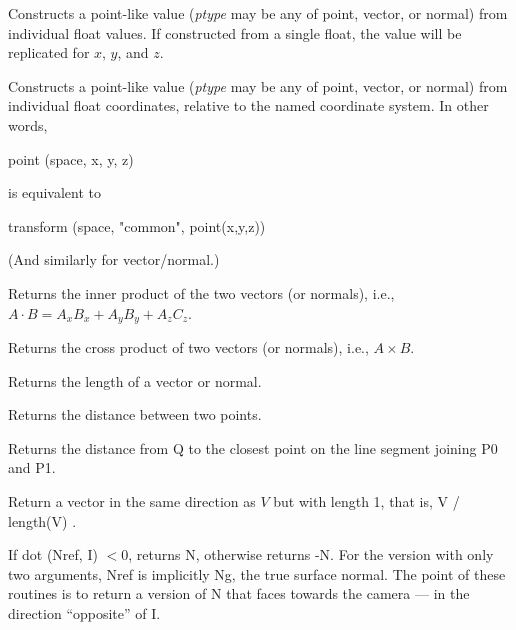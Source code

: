 \documentclass[11pt,letterpaper]{book}
\def\float{{\cf float}\xspace}
\def\normal{{\cf normal}\xspace}
\def\point{{\cf point}\xspace}
\def\vector{{\cf vector}\xspace}
\begin{document}
Constructs a point-like value (\emph{ptype} may be any of \point,
\vector, or \normal) from individual \float values.  If constructed
from a single \float, the value will be replicated for $x$, $y$, and $z$.

\apiend

  
Constructs a point-like value (\emph{ptype} may be any of \point,
\vector, or \normal) from individual \float coordinates, relative
to the named coordinate system.  In other words,
\begin{code}
    point (space, x, y, z)
\end{code}
\noindent is equivalent to
\begin{code}
    transform (space, "common", point(x,y,z))
\end{code}
(And similarly for \vector/\normal.)
\apiend

Returns the inner product of the two vectors (or normals), i.e., 
$A \cdot B = A_x B_x + A_y B_y + A_z C_z$.
\apiend

Returns the cross product of two vectors (or normals), i.e., 
$A \times B$.
\apiend

Returns the length of a vector or normal.
\apiend

Returns the distance between two points.
\apiend

Returns the distance from {\cf Q} to the closest point on the line
segment joining {\cf P0} and {\cf P1}.
\apiend

Return a vector in the same direction as $V$ but with length 1,
that is, {\cf V / length(V)} .
\apiend

If {\cf dot (Nref, I)} $<0$, returns {\cf N}, otherwise returns {\cf -N}.
For the version with only two arguments, {\cf Nref} is implicitly {\cf
Ng}, the true surface normal.  The point of these routines is to
return a version of {\cf N} that faces towards the camera --- in the
direction ``opposite'' of {\cf I}.
\end{document}

